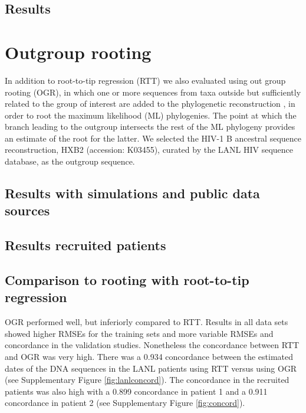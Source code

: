\documentclass[12pt]{article}
\begin{document}
\subsection*{Results}

\section{Outgroup rooting}
In addition to root-to-tip regression (RTT) we also evaluated using out group rooting (OGR), in which one or more sequences from taxa outside but sufficiently related to the group of interest are added to the phylogenetic reconstruction \cite{Huelsenbeck02}, in order to root the maximum likelihood (ML) phylogenies.
The point at which the branch leading to the outgroup intersects the rest of the ML phylogeny provides an estimate of the root for the latter.
We selected the HIV-1 B ancestral sequence reconstruction, HXB2 (accession: K03455), curated by the LANL HIV sequence database, as the outgroup sequence.

\subsection*{Results with simulations and public data sources}

\subsection*{Results recruited patients}

\subsection*{Comparison to rooting with root-to-tip regression}
OGR performed well, but inferiorly compared to RTT.
Results in all data sets showed higher RMSEs for the training sets and more variable RMSEs and concordance in the validation studies.
Nonetheless the concordance between RTT and OGR was very high.
There was a 0.934 concordance \cite{Lin89} between the estimated dates of the DNA sequences in the LANL patients using RTT versus using OGR (see Supplementary Figure \ref{fig:lanlconcord}).
The concordance in the recruited patients was also high with a 0.899 concordance in patient 1 and a 0.911 concordance in patient 2 (see Supplementary Figure \ref{fig:concord}).
\end{document}
